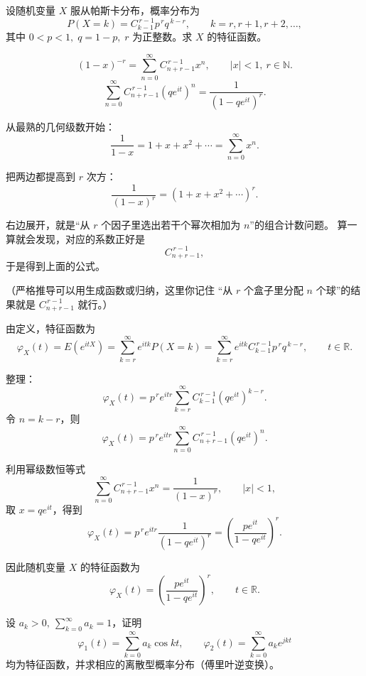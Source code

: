 \begin{homework}[4.2]
设随机变量 $X$ 服从帕斯卡分布，概率分布为
\[
P(X=k)=C^{\,r-1}_{k-1} p^{\,r} q^{\,k-r},\qquad k=r,r+1,r+2,\ldots,
\]
其中 $0<p<1,\; q=1-p,\; r$ 为正整数。求 $X$ 的特征函数。
\end{homework}
\begin{dxtips}[负二项级数展开公式]
    \[
(1-x)^{-r}
=\sum_{n=0}^{\infty} C_{n+r-1}^{\,r-1} x^{n},
\qquad |x|<1,\ r\in\mathbb N.
\]
\[
\sum_{n=0}^{\infty} C_{n+r-1}^{\,r-1} (q e^{it})^{n}
= \frac{1}{(1-q e^{it})^{r}}.
\]
\end{dxtips}
\begin{dxtips}[负二项的来源]
  从最熟的几何级数开始：
\[
\frac{1}{1-x}=1+x+x^2+\cdots=\sum_{n=0}^{\infty}x^n.
\]

把两边都提高到 $r$ 次方：
\[
\frac{1}{(1-x)^r}=(1+x+x^2+\cdots)^r.
\]

右边展开，就是“从 $r$ 个因子里选出若干个幂次相加为 $n$”的组合计数问题。
算一算就会发现，对应的系数正好是
\[
C_{n+r-1}^{\,r-1},
\]
于是得到上面的公式。

（严格推导可以用生成函数或归纳，这里你记住
“从 $r$ 个盒子里分配 $n$ 个球”的结果就是 $C_{n+r-1}^{\,r-1}$ 就行。）  
\end{dxtips}
\begin{solution}
由定义，特征函数为
\[
\varphi_X(t)
=E(e^{itX})
=\sum_{k=r}^{\infty} e^{itk} P(X=k)
=\sum_{k=r}^{\infty} e^{itk} C_{k-1}^{\,r-1} p^{\,r} q^{\,k-r},
\qquad t\in\mathbb{R}.
\]

整理：
\[
\varphi_X(t)
= p^{\,r} e^{itr}
  \sum_{k=r}^{\infty} C_{k-1}^{\,r-1}
       (q e^{it})^{k-r}.
\]
令 $n=k-r$，则
\[
\varphi_X(t)
= p^{\,r} e^{itr}
  \sum_{n=0}^{\infty} C_{n+r-1}^{\,r-1} (q e^{it})^{n}.
\]

利用幂级数恒等式
\[
\sum_{n=0}^{\infty} C_{n+r-1}^{\,r-1} x^{n}
= \frac{1}{(1-x)^{r}},\qquad |x|<1,
\]
取 $x=q e^{it}$，得到
\[
\varphi_X(t)
= p^{\,r} e^{itr} \frac{1}{(1-q e^{it})^{r}}
= \left(\frac{p e^{it}}{1-q e^{it}}\right)^{r}.
\]

因此随机变量 $X$ 的特征函数为
\[
\boxed{\displaystyle
\varphi_X(t)=\left(\frac{p e^{it}}{1-q e^{it}}\right)^{r}},\qquad t\in\mathbb{R}.
\]
\end{solution}
\begin{homework}[4.5]
设 $a_k>0,\ \sum_{k=0}^{\infty}a_k=1$，证明
\[
\varphi_1(t)=\sum_{k=0}^\infty a_k\cos kt,\qquad 
\varphi_2(t)=\sum_{k=0}^\infty a_k e^{jkt}
\]
均为特征函数，并求相应的离散型概率分布（傅里叶逆变换）。
\end{homework}
